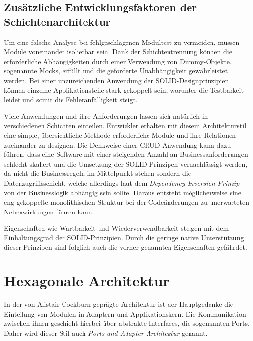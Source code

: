 \documentclass[conference]{IEEEtran}
\begin{document}
\subsection{Zusätzliche Entwicklungsfaktoren der Schichtenarchitektur}

Um eine falsche Analyse bei fehlgeschlagenen Modultest zu vermeiden, müssen Module voneinander isolierbar sein. Dank der Schichtentrennung können die erforderliche Abhängigkeiten durch einer Verwendung von Dummy-Objekte, sogenannte Mocks, erfüllt und die geforderte Unabhängigkeit gewährleistet werden. Bei einer unzureichenden Anwendung der SOLID-Designprinzipien können einzelne Applikationsteile stark gekoppelt sein, worunter die Testbarkeit leidet und somit die Fehleranfälligkeit steigt.

Viele Anwendungen und ihre Anforderungen lassen sich natürlich in verschiedenen Schichten einteilen. Entwickler erhalten mit diesem Architekturstil eine simple, übersichtliche Methode erforderliche Module und ihre Relationen zueinander zu designen. Die Denkweise einer CRUD-Anwendung kann dazu führen, dass eine Software mit einer steigenden Anzahl an Businessanforderungen schlecht skaliert und die Umsetzung der SOLID-Prinzipen vernachlässigt werden, da nicht die Businessregeln im Mittelpunkt stehen sondern die Datenzugriffsschicht, welche allerdings laut dem \emph{Dependency-Inversion-Prinzip} von der Businesslogik abhängig sein sollte. Daraus entsteht möglicherweise eine eng gekoppelte monolithischen Struktur bei der Codeänderungen zu unerwarteten Nebenwirkungen führen kann.

Eigenschaften wie Wartbarkeit und Wiederverwendbarkeit steigen mit dem Einhaltungsgrad der SOLID-Prinzipien. Durch die geringe native Unterstützung dieser Prinzipen sind folglich auch die vorher genannten Eigenschaften gefährdet. 





\section{Hexagonale Architektur}


In der von Alistair Cockburn geprägte Architektur ist der Hauptgedanke die Einteilung von Modulen in Adaptern und Applikationskern. Die Kommunikation zwischen ihnen geschieht hierbei über abstrakte Interfaces, die sogenannten Ports. Daher wird dieser Stil auch \emph{Ports und Adapter Architektur} genannt. 
\end{document}
